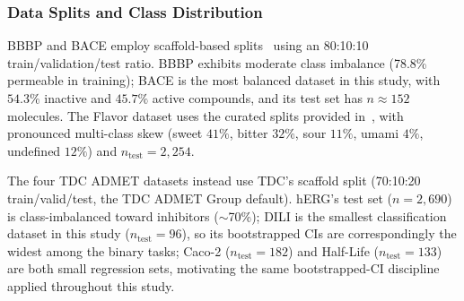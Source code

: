 \documentclass[pdflatex,sn-mathphys-num]{sn-jnl}%
\begin{document}
\subsubsection{Data Splits and Class Distribution}\label{sec:data_splits}
BBBP and BACE employ scaffold-based splits~\cite{ramsundar2019deep} using an 80:10:10 train/validation/test ratio. BBBP exhibits moderate class imbalance (78.8\% permeable in training); BACE is the most balanced dataset in this study, with $54.3\%$ inactive and $45.7\%$ active compounds, and its test set has $n\approx152$ molecules. The Flavor dataset uses the curated splits provided in~\cite{zimmermann2024fart}, with pronounced multi-class skew (sweet $41\%$, bitter $32\%$, sour $11\%$, umami $4\%$, undefined $12\%$) and $n_\text{test}=2{,}254$.

The four TDC ADMET datasets instead use TDC's scaffold split (70:10:20 train/valid/test, the TDC ADMET Group default). hERG's test set ($n=2{,}690$) is class-imbalanced toward inhibitors ($\sim$70\%); DILI is the smallest classification dataset in this study ($n_\text{test}=96$), so its bootstrapped CIs are correspondingly the widest among the binary tasks; Caco-2 ($n_\text{test}=182$) and Half-Life ($n_\text{test}=133$) are both small regression sets, motivating the same bootstrapped-CI discipline applied throughout this study.

\begin{table}[!ht]
\centering
\caption{Structural summary of the seven PEARL benchmark datasets.}
\label{tab:dataset_summary}
\end{table}
\end{document}

